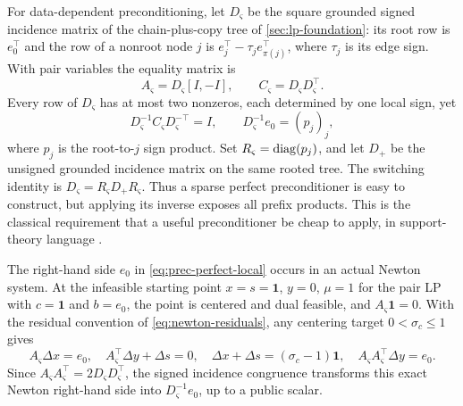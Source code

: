 For data-dependent preconditioning, let $D_\varsigma$ be the square grounded
signed incidence matrix of the chain-plus-copy tree of
\cref{sec:lp-foundation}: its root row is $e_0^\top$
and the row of a nonroot node $j$ is
$e_j^\top-\tau_je_{\pi(j)}^\top$, where $\tau_j$ is its edge sign.  With pair
variables the equality matrix is
\begin{equation}
 A_\varsigma=D_\varsigma[I,-I],\qquad
 C_\varsigma=D_\varsigma D_\varsigma^\top.                  \label{eq:prec-tree-normal}
\end{equation}
Every row of $D_\varsigma$ has at most two nonzeros, each determined by one
local sign, yet
\begin{equation}
 D_\varsigma^{-1}C_\varsigma D_\varsigma^{-\top}=I,\qquad
 D_\varsigma^{-1}e_0=(p_j)_j,                             \label{eq:prec-perfect-local}
\end{equation}
where $p_j$ is the root-to-$j$ sign product.  Set
$R_\varsigma=\operatorname{diag}(p_j)$, and let $D_+$ be the unsigned grounded incidence
matrix on the same rooted tree.  The switching identity is
$D_\varsigma=R_\varsigma D_+R_\varsigma$.  Thus a sparse perfect
preconditioner is easy to construct, but applying its inverse exposes all
prefix products.  This is the classical requirement that a useful
preconditioner be cheap to apply, in support-theory language
\cite{boman2003-support-theory-for-preconditioning}.

The right-hand side $e_0$ in \eqref{eq:prec-perfect-local} occurs in an
actual Newton system.  At the infeasible starting point
$x=s=\mathbf1$, $y=0$, $\mu=1$ for the pair LP with $c=\mathbf1$ and
$b=e_0$, the point is centered and dual feasible, and $A_\varsigma\mathbf1=0$.
With the residual convention of \eqref{eq:newton-residuals}, any centering
target $0<\sigma_c\leq1$ gives
\begin{equation}
 A_\varsigma\Delta x=e_0,\quad
 A_\varsigma^\top\Delta y+\Delta s=0,\quad
 \Delta x+\Delta s=(\sigma_c-1)\mathbf1,\quad
 A_\varsigma A_\varsigma^\top\Delta y=e_0.                  \label{eq:prec-actual-newton}
\end{equation}
Since $A_\varsigma A_\varsigma^\top=2D_\varsigma D_\varsigma^\top$, the signed
incidence congruence transforms this exact Newton right-hand side into
$D_\varsigma^{-1}e_0$, up to a public scalar.

